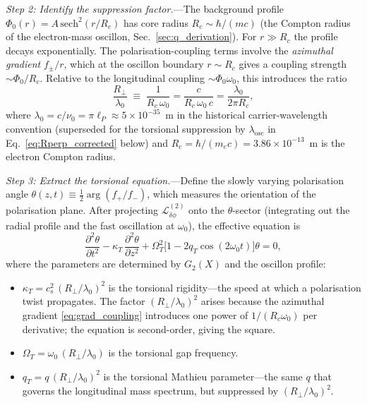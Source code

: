 \documentclass[11pt]{article}
\begin{document}
\textit{Step 2: Identify the
suppression factor.}---The background profile
$\Phi_0(r) = A\,\mathrm{sech}^2(r/R_c)$
has core radius $R_c \sim \hbar/(mc)$
(the Compton radius of the electron-mass
oscillon, Sec.~\ref{sec:q_derivation}).
For $r \gg R_c$ the profile decays
exponentially.  The polarisation-coupling terms
involve the \emph{azimuthal gradient}
$f_\pm / r$, which at the oscillon boundary
$r \sim R_c$ gives a coupling strength
$\sim \Phi_0 / R_c$.  Relative to the
longitudinal coupling $\sim \Phi_0\omega_0$,
this introduces the ratio
\begin{equation}\label{eq:Rperp_definition}
  \frac{R_\perp}{\lambda_0}
  \;\equiv\;
  \frac{1}{R_c\,\omega_0}
  = \frac{c}{R_c\,\omega_0\,c}
  = \frac{\lambda_0}{2\pi R_c},
\end{equation}
where $\lambda_0 = c/\nu_0
= \pi\ell_P \approx 5\times 10^{-35}$~m
in the historical carrier-wavelength convention
(superseded for the torsional suppression by
$\lambda_{\mathrm{osc}}$ in Eq.~\eqref{eq:Rperp_corrected}
below)
and $R_c = \hbar/(m_e c)
= 3.86\times 10^{-13}$~m is the electron
Compton radius.

\textit{Step 3: Extract the torsional
equation.}---Define the slowly varying
polarisation angle
$\theta(z,t) \equiv
\tfrac{1}{2}\arg(f_+/f_-)$,
which measures the orientation of the
polarisation plane.  After projecting
$\mathcal{L}^{(2)}_{\delta\phi}$ onto the
$\theta$-sector (integrating out the radial
profile and the fast oscillation at $\omega_0$),
the effective equation is
\begin{equation}\label{eq:torsion_equation}
  \boxed{
  \frac{\partial^2\theta}{\partial t^2}
  - \kappa_T\,
  \frac{\partial^2\theta}{\partial z^2}
  + \Omega_T^2\bigl[1
  - 2q_T\cos(2\omega_0 t)\bigr]\theta
  = 0,
  }
\end{equation}
where the parameters are determined by
$G_2(X)$ and the oscillon profile:
\begin{itemize}
  \item $\kappa_T
  = c_s^2\,(R_\perp/\lambda_0)^2$
  is the torsional rigidity---the speed at
  which a polarisation twist propagates.
  The factor $(R_\perp/\lambda_0)^2$ arises
  because the azimuthal gradient
  \eqref{eq:grad_coupling} introduces one power
  of $1/(R_c\omega_0)$ per derivative; the
  equation is second-order, giving the square.
  \item $\Omega_T = \omega_0\,(R_\perp/\lambda_0)$
  is the torsional gap frequency.
  \item $q_T = q\,(R_\perp/\lambda_0)^2$ is the
  torsional Mathieu parameter---the same $q$ that
  governs the longitudinal mass spectrum, but
  suppressed by $(R_\perp/\lambda_0)^2$.
\end{itemize}
\end{document}
